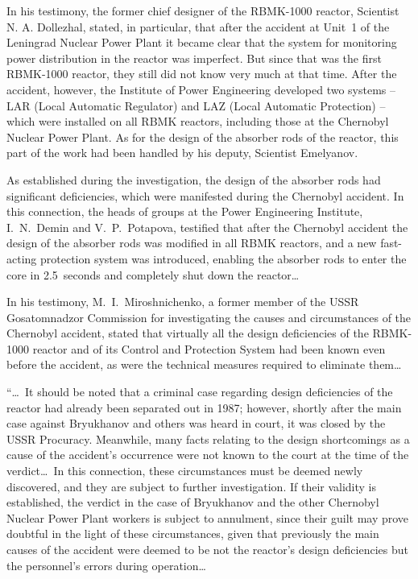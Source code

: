 \documentclass[openright]{bookest}
\begin{document}
In his testimony, the former chief designer of the RBMK-1000 reactor, Scientist N. A. Dollezhal, stated, in particular, that after the accident at Unit~1 of the Leningrad Nuclear Power Plant it became clear that the system for monitoring power distribution in the reactor was imperfect. But since that was the first RBMK-1000 reactor, they still did not know very much at that time. After the accident, however, the Institute of Power Engineering developed two systems -- LAR (Local Automatic Regulator) and LAZ (Local Automatic Protection) -- which were installed on all RBMK reactors, including those at the Chernobyl Nuclear Power Plant. As for the design of the absorber rods of the reactor, this part of the work had been handled by his deputy, Scientist Emelyanov.

As established during the investigation, the design of the absorber rods had significant deficiencies, which were manifested during the Chernobyl accident. In this connection, the heads of groups at the Power Engineering Institute, I.~N.~Demin and V.~P.~Potapova, testified that after the Chernobyl accident the design of the absorber rods was modified in all RBMK reactors, and a new fast-acting protection system was introduced, enabling the absorber rods to enter the core in \num{2.5}~seconds and completely shut down the reactor\ldots

In his testimony, M.~I.~Miroshnichenko, a former member of the USSR Gosatomnadzor Commission for investigating the causes and circumstances of the Chernobyl accident, stated that virtually all the design deficiencies of the RBMK-1000 reactor and of its Control and Protection System had been known even before the accident, as were the technical measures required to eliminate them\ldots


``\ldots~It should be noted that a criminal case regarding design deficiencies of the reactor had already been separated out in 1987; however, shortly after the main case against Bryukhanov and others was heard in court, it was closed by the USSR Procuracy. Meanwhile, many facts relating to the design shortcomings as a cause of the accident's occurrence were not known to the court at the time of the verdict\ldots~In this connection, these circumstances must be deemed newly discovered, and they are subject to further investigation. If their validity is established, the verdict in the case of Bryukhanov and the other Chernobyl Nuclear Power Plant workers is subject to annulment, since their guilt may prove doubtful in the light of these circumstances, given that previously the main causes of the accident were deemed to be not the reactor's design deficiencies but the personnel's errors during operation\ldots
\end{document}
